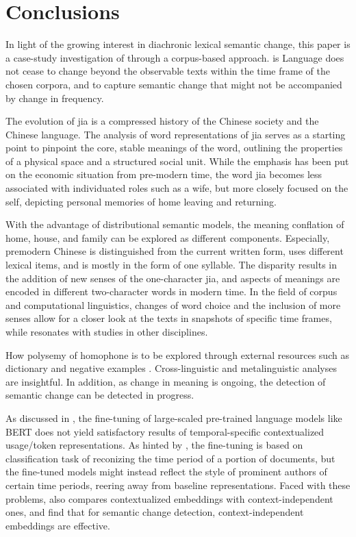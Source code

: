 

\chapter{Conclusions}
In light of the growing interest in diachronic lexical semantic change, this paper is a case-study investigation of \jia through a corpus-based approach. is Language does not cease to change beyond the observable texts within the time frame of the chosen corpora, and to capture semantic change that might not be accompanied by change in frequency.

The evolution of jia is a compressed history of the Chinese society and the Chinese language. The analysis of word representations of jia serves as a starting point to pinpoint the core, stable meanings of the word, outlining the properties of a physical space and a structured social unit. While the emphasis has been put on the economic situation from pre-modern time, the word jia becomes less associated with individuated roles such as a wife, but more closely focused on the self, depicting personal memories of home leaving and returning. 

With the advantage of distributional semantic models, the meaning conflation of home, house, and family can be explored as different components. Especially, premodern Chinese is distinguished from the current written form, uses different lexical items, and is mostly in the form of one syllable. The disparity results in the addition of new senses of the one-character jia, and aspects of meanings are encoded in different two-character words in modern time. In the field of corpus and computational linguistics, changes of word choice and the inclusion of more senses allow for a closer look at the texts in snapshots of specific time frames, while resonates with studies in other disciplines.

How polysemy of homophone is to be explored through external resources such as dictionary and negative examples \textcite[15]{traugott2001regularity}.  Cross-linguistic and metalinguistic analyses are insightful. In addition, as change in meaning is ongoing, the detection of semantic change can be detected in progress.

As discussed in \textcite{giulianelli2019lexical}, the fine-tuning of large-scaled pre-trained language models like BERT does not yield satisfactory results of temporal-specific contextualized usage/token representations. As hinted by \textcite{giulianelli2019lexical}, the fine-tuning is based on classification task of reconizing the time period of a portion of documents, but the fine-tuned models might instead reflect the style of prominent authors of certain time periods, reering away from baseline representations. Faced with these problems, \textcite{kutuzov2020uio} also compares contextualized embeddings with context-independent ones, and find that for semantic change detection, context-independent embeddings are effective.

